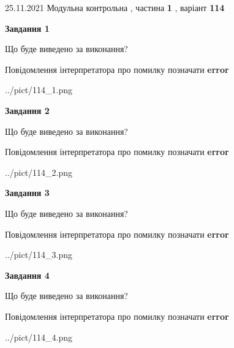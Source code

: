 \documentclass[10pt, ukrainian]{article}
\begin{document}
{25.11.2021 Модульна контрольна , частина \textbf { 1 }, варіант  \No \textbf { 114 }\par}
{
\begin {large}

{\begin {center}\textbf{Завдання 1}\end {center}}\par
Що буде виведено за виконання? \par
Повідомлення інтерпретатора про помилку позначати \textbf{error}

\begin{center}
	{../pict/114_1.png}
\end{center}
\newpage

{\begin {center}\textbf{Завдання 2}\end {center}}\par
Що буде виведено за виконання? \par
Повідомлення інтерпретатора про помилку позначати \textbf{error}

\begin{center}
	{../pict/114_2.png}
\end{center}
\newpage

{\begin {center}\textbf{Завдання 3}\end {center}}\par
Що буде виведено за виконання? \par
Повідомлення інтерпретатора про помилку позначати \textbf{error}

\begin{center}
	{../pict/114_3.png}
\end{center}
\newpage

{\begin {center}\textbf{Завдання 4}\end {center}}\par
Що буде виведено за виконання? \par
Повідомлення інтерпретатора про помилку позначати \textbf{error}

\begin{center}
	{../pict/114_4.png}
\end{center}
\newpage


\end{large}}
\end{document}
